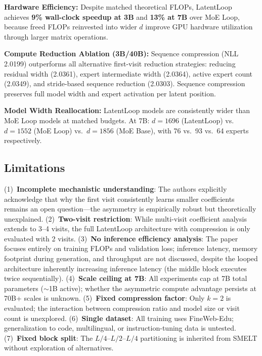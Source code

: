 \documentclass[11pt,a4paper]{article}
\begin{document}
\textbf{Hardware Efficiency:} Despite matched theoretical FLOPs, LatentLoop achieves \textbf{9\% wall-clock speedup at 3B} and \textbf{13\% at 7B} over MoE Loop, because freed FLOPs reinvested into wider $d$ improve GPU hardware utilization through larger matrix operations.

\textbf{Compute Reduction Ablation (3B/40B):} Sequence compression (NLL 2.0199) outperforms all alternative first-visit reduction strategies: reducing residual width (2.0361), expert intermediate width (2.0364), active expert count (2.0349), and stride-based sequence reduction (2.0303). Sequence compression preserves full model width and expert activation per latent position.

\textbf{Model Width Reallocation:} LatentLoop models are consistently wider than MoE Loop models at matched budgets. At 7B: $d{=}1696$ (LatentLoop) vs.\ $d{=}1552$ (MoE Loop) vs.\ $d{=}1856$ (MoE Base), with 76 vs.\ 93 vs.\ 64 experts respectively.

\subsection{Limitations}
(1)~\textbf{Incomplete mechanistic understanding}: The authors explicitly acknowledge that why the first visit consistently learns smaller coefficients remains an open question---the asymmetry is empirically robust but theoretically unexplained. (2)~\textbf{Two-visit restriction}: While multi-visit coefficient analysis extends to 3--4 visits, the full LatentLoop architecture with compression is only evaluated with 2 visits. (3)~\textbf{No inference efficiency analysis}: The paper focuses entirely on training FLOPs and validation loss; inference latency, memory footprint during generation, and throughput are not discussed, despite the looped architecture inherently increasing inference latency (the middle block executes twice sequentially). (4)~\textbf{Scale ceiling at 7B}: All experiments cap at 7B total parameters ($\sim$1B active); whether the asymmetric compute advantage persists at 70B+ scales is unknown. (5)~\textbf{Fixed compression factor}: Only $k{=}2$ is evaluated; the interaction between compression ratio and model size or visit count is unexplored. (6)~\textbf{Single dataset}: All training uses FineWeb-Edu; generalization to code, multilingual, or instruction-tuning data is untested. (7)~\textbf{Fixed block split}: The $L/4$--$L/2$--$L/4$ partitioning is inherited from SMELT without exploration of alternatives.
\end{document}
